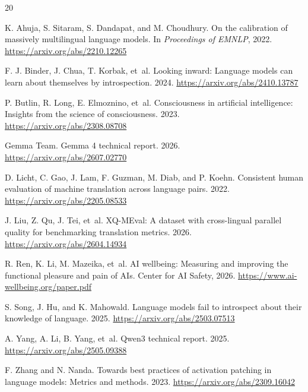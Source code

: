 \begin{thebibliography}{20}

K. Ahuja, S. Sitaram, S. Dandapat, and M. Choudhury. On the calibration of massively multilingual language models. In \emph{Proceedings of EMNLP}, 2022. \url{https://arxiv.org/abs/2210.12265}

F. J. Binder, J. Chua, T. Korbak, et~al. Looking inward: Language models can learn about themselves by introspection. 2024. \url{https://arxiv.org/abs/2410.13787}

P. Butlin, R. Long, E. Elmoznino, et~al. Consciousness in artificial intelligence: Insights from the science of consciousness. 2023. \url{https://arxiv.org/abs/2308.08708}

Gemma Team. Gemma 4 technical report. 2026. \url{https://arxiv.org/abs/2607.02770}

D. Licht, C. Gao, J. Lam, F. Guzman, M. Diab, and P. Koehn. Consistent human evaluation of machine translation across language pairs. 2022. \url{https://arxiv.org/abs/2205.08533}

J. Liu, Z. Qu, J. Tei, et~al. XQ-MEval: A dataset with cross-lingual parallel quality for benchmarking translation metrics. 2026. \url{https://arxiv.org/abs/2604.14934}

R. Ren, K. Li, M. Mazeika, et~al. AI wellbeing: Measuring and improving the functional pleasure and pain of AIs. Center for AI Safety, 2026. \url{https://www.ai-wellbeing.org/paper.pdf}

S. Song, J. Hu, and K. Mahowald. Language models fail to introspect about their knowledge of language. 2025. \url{https://arxiv.org/abs/2503.07513}

A. Yang, A. Li, B. Yang, et~al. Qwen3 technical report. 2025. \url{https://arxiv.org/abs/2505.09388}

F. Zhang and N. Nanda. Towards best practices of activation patching in language models: Metrics and methods. 2023. \url{https://arxiv.org/abs/2309.16042}

\end{thebibliography}
